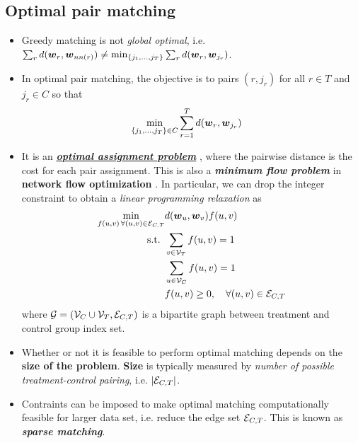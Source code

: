 \documentclass[11pt]{article}
\begin{document}
\subsection{Optimal pair matching}
\begin{itemize}
\item Greedy matching is not \emph{global optimal}, i.e. $\sum_{r}d(\boldsymbol{w}_r, \boldsymbol{w}_{nn(r)}) \neq \min_{\left\{j_1, \ldots, j_T\right\}}\sum_{r}d(\boldsymbol{w}_r, \boldsymbol{w}_{j_r})$.

\item In optimal pair matching, the objective is to pairs $(r, j_r)$ for all $r \in T$ and $j_r \in C$ so that
\begin{align*}
\min_{\left\{j_1, \ldots, j_T\right\} \in C} &\sum_{r=1}^{T}d(\boldsymbol{w}_r, \boldsymbol{w}_{j_r}) 
\end{align*}

\item  It is  an \underline{\emph{\textbf{optimal assignment problem}}} \citep{gabriel2019computational}, where the pairwise distance is the cost for each pair assignment. This is also a \emph{\textbf{minimum flow problem}} in \textbf{network flow optimization} \citep{rosenbaum2017observation}. In particular, we can drop the integer constraint to obtain a \emph{linear programming relaxation} as
\begin{align*}
\min_{f(u, v) \, \forall (u,v) \in {\mathcal E}_{C,T}}& d(\boldsymbol{w}_u, \boldsymbol{w}_{v}) f(u, v)\\
\text{s.t. }& \sum_{v \in {\mathcal V}_{T}}f(u, v) = 1 \\
&\sum_{u \in {\mathcal V}_{C}}f(u, v) =  1  \\
& f(u, v)  \ge 0, \quad \forall (u,v) \in {\mathcal E}_{C,T}
\end{align*} where ${\mathcal G} = ({\mathcal V}_{C}\cup{\mathcal V}_{T}, {\mathcal E}_{C,T})$ is a bipartite graph between treatment and control group index set.

\item Whether or not it is feasible to perform optimal matching depends on the \textbf{size of the problem}. \textbf{Size} is typically measured by \emph{number of possible treatment-control pairing}, i.e. $|{\mathcal E}_{C,T}|$.

\item Contraints can be imposed to make optimal matching computationally feasible for larger data set, i.e. reduce the edge set ${\mathcal E}_{C,T}$. This is known as \emph{\textbf{sparse matching}}.
\end{itemize}
\end{document}

